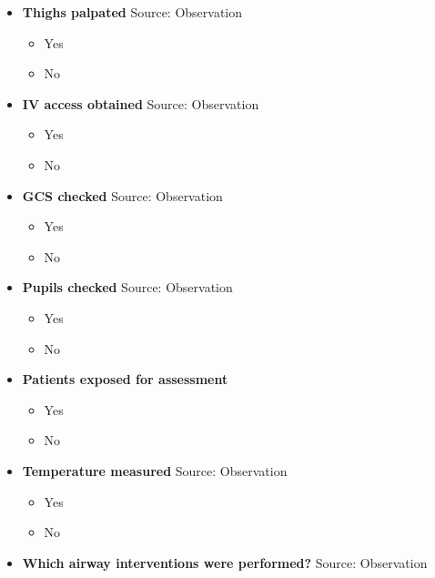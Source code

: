 \documentclass[
]{scrartcl}
\providecommand{\tightlist}{%
  \setlength{\itemsep}{0pt}\setlength{\parskip}{0pt}}\usepackage{longtable,booktabs,array}
\begin{document}
\begin{itemize}
  \begin{itemize}
  \tightlist
  \item
    Yes
  \item
    No
  \end{itemize}
\item
  \textbf{Thighs palpated} Source: Observation

  \begin{itemize}
  \tightlist
  \item
    Yes
  \item
    No
  \end{itemize}
\item
  \textbf{IV access obtained} Source: Observation

  \begin{itemize}
  \tightlist
  \item
    Yes
  \item
    No
  \end{itemize}
\item
  \textbf{GCS checked} Source: Observation

  \begin{itemize}
  \tightlist
  \item
    Yes
  \item
    No
  \end{itemize}
\item
  \textbf{Pupils checked} Source: Observation

  \begin{itemize}
  \tightlist
  \item
    Yes
  \item
    No
  \end{itemize}
\item
  \textbf{Patients exposed for assessment}

  \begin{itemize}
  \tightlist
  \item
    Yes
  \item
    No
  \end{itemize}
\item
  \textbf{Temperature measured} Source: Observation

  \begin{itemize}
  \tightlist
  \item
    Yes
  \item
    No
  \end{itemize}
\item
  \textbf{Which airway interventions were performed?} Source:
  Observation


\end{itemize}
\end{document}
